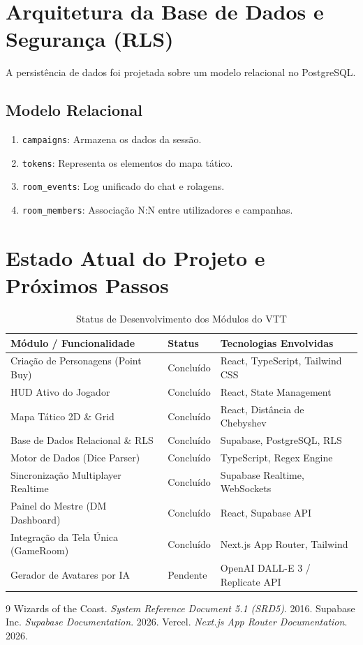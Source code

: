 \documentclass[12pt,a4paper]{article}
\begin{document}
\section{Arquitetura da Base de Dados e Segurança (RLS)}
A persistência de dados foi projetada sobre um modelo relacional no PostgreSQL.

\subsection{Modelo Relacional}
\begin{enumerate}
    \item \texttt{campaigns}: Armazena os dados da sessão.
    \item \texttt{tokens}: Representa os elementos do mapa tático.
    \item \texttt{room\_events}: Log unificado do chat e rolagens.
    \item \texttt{room\_members}: Associação N:N entre utilizadores e campanhas.
\end{enumerate}

\section{Estado Atual do Projeto e Próximos Passos}
\begin{table}[h!]
\centering
\caption{Status de Desenvolvimento dos Módulos do VTT}
\begin{tabular}{lll}
\toprule
\textbf{Módulo / Funcionalidade} & \textbf{Status} & \textbf{Tecnologias Envolvidas} \\
\midrule
Criação de Personagens (Point Buy) & Concluído & React, TypeScript, Tailwind CSS \\
HUD Ativo do Jogador & Concluído & React, State Management \\
Mapa Tático 2D \& Grid & Concluído & React, Distância de Chebyshev \\
Base de Dados Relacional \& RLS & Concluído & Supabase, PostgreSQL, RLS \\
Motor de Dados (Dice Parser) & Concluído & TypeScript, Regex Engine \\
Sincronização Multiplayer Realtime & Concluído & Supabase Realtime, WebSockets \\
Painel do Mestre (DM Dashboard) & Concluído & React, Supabase API \\
Integração da Tela Única (GameRoom)& Concluído & Next.js App Router, Tailwind \\
Gerador de Avatares por IA & Pendente & OpenAI DALL-E 3 / Replicate API \\
\bottomrule
\end{tabular}
\end{table}

\begin{thebibliography}{9}
 Wizards of the Coast. \textit{System Reference Document 5.1 (SRD5)}. 2016.
 Supabase Inc. \textit{Supabase Documentation}. 2026.
 Vercel. \textit{Next.js App Router Documentation}. 2026.
\end{thebibliography}
\end{document}
